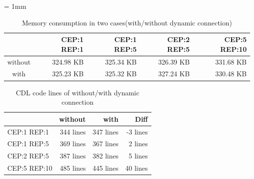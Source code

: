 \documentclass[conference]{IEEEtran/IEEEtran}
\begin{document}
\begin{table}[t]
    \centering
    \vspace{-1mm} \caption{Memory consumption in two cases\protect\linebreak (with/without dynamic connection)}
    {\tabcolsep = 1mm
    \begin{tabular}{c|r|r|r|r}
        \hline\hline
                &  CEP:1 REP:1 & CEP:1 REP:5 & CEP:2 REP:5 & CEP:5 REP:10 \\ \hline
        without &  324.98 KB   & 325.34 KB   & 326.39 KB   & 331.68 KB   \\
        with    &  325.23 KB   & 325.32 KB   & 327.24 KB   & 330.48 KB   \\
        \hline
    \end{tabular}
    }
    \label{fig:EvaluationOfDynamicConnection}
\end{table}

\begin{table}[t]
    \centering
    \vspace{-1mm} \caption{CDL code lines of without/with dynamic connection}
    \begin{tabular}{l|r|r|r}
        \hline\hline
                     &  without  &  with  &  Diff  \\ \hline
        CEP:1 REP:1  &  344 lines     &  347 lines  &  -3 lines   \\
        CEP:1 REP:5  &  369 lines     &  367 lines  &   2 lines   \\
        CEP:2 REP:5  &  387 lines     &  382 lines  &   5 lines   \\
        CEP:5 REP:10 &  485 lines     &  445 lines  &  40 lines   \\
        \hline
    \end{tabular}
    \label{tab:EvaluationOfConfigurabilityByDynamicConnection}
\end{table}
\end{document}
